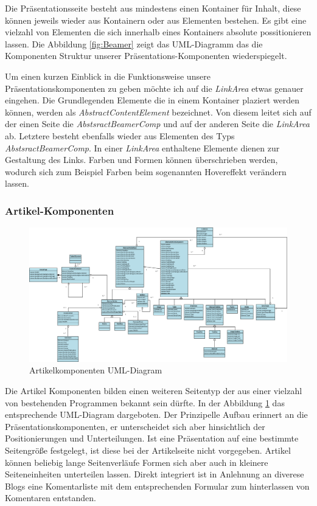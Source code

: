 \documentclass[12pt]{article}
\begin{document}
Die Präsentationsseite besteht aus mindestens einen Kontainer für Inhalt, diese können jeweils wieder aus Kontainern oder aus Elementen bestehen.
Es gibt eine vielzahl von Elementen die sich innerhalb eines Kontainers absolute possitionieren lassen. Die Abbildung \ref{fig:Beamer} zeigt
das UML-Diagramm das die Komponenten Struktur unserer Präsentations-Komponenten wiederspiegelt. 

Um einen kurzen Einblick in die Funktionsweise unsere Präsentationskomponenten zu geben möchte ich auf die \textit{LinkArea} etwas genauer eingehen. 
Die Grundlegenden Elemente die in einem Kontainer plaziert werden können, werden als \textit{AbstractContentElement} bezeichnet. Von diesem leitet
sich auf der einen Seite die \textit{AbstsractBeamerComp} und auf der anderen Seite die \textit{LinkArea} ab. Letztere besteht ebenfalls wieder
aus Elementen des Typs \textit{AbstsractBeamerComp}. In einer \textit{LinkArea} enthaltene Elemente dienen zur Gestaltung des Links. Farben und Formen
können überschrieben werden, wodurch sich zum Beispiel Farben beim sogenannten Hovereffekt verändern lassen.

\subsubsection{Artikel-Komponenten}

\begin{figure}[h]
	\centering
	\includegraphics[width=1.0\textwidth]{Artikel.png}
	\caption{Artikelkomponenten UML-Diagram}
	\label{fig:Artikel}
\end{figure}

Die Artikel Komponenten bilden einen weiteren Seitentyp der aus einer vielzahl von bestehenden Programmen
bekannt sein dürfte. In der Abbildung \ref{fig:Artikel} das entsprechende UML-Diagram dargeboten.
Der Prinzipelle Aufbau erinnert an die Präsentationskomponenten, er unterscheidet sich aber hinsichtlich
der Positionierungen und Unterteilungen. Ist eine Präsentation auf eine bestimmte Seitengröße festgelegt, ist diese bei der Artikelseite
nicht vorgegeben. Artikel können beliebig lange Seitenverläufe Formen sich aber auch in kleinere Seiteneinheiten unterteilen lassen.
Direkt integriert ist in Anlehnung an diverese Blogs eine Komentarliste mit dem entsprechenden Formular zum hinterlassen
von Komentaren entstanden.
\end{document}
